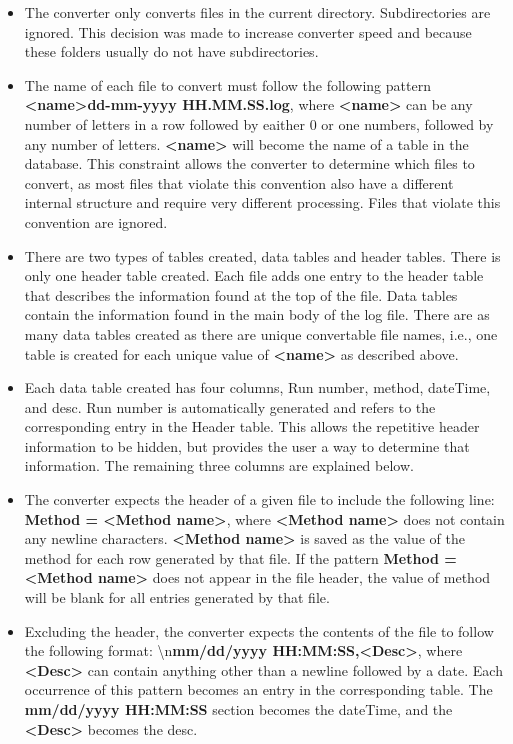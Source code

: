\documentclass[letterpaper,11pt,twoside,final]{article}
\begin{document}
\begin{itemize}
  \item The converter only converts files in the current
directory. Subdirectories are ignored. This decision was made to
increase converter speed and because these folders usually
do not have subdirectories. 
  \item The name of each file to convert must follow the following pattern
    \textbf{<name>dd-mm-yyyy HH.MM.SS.log}, where \textbf{<name>} can
    be any number of letters in a row followed by eaither 0 or one numbers, followed by any number of letters.
    \textbf{<name>} will
    become the name of a table in the database.
    This constraint allows the converter to determine which files to
    convert, as most files that violate this convention also have a
    different internal structure and require very different
    processing. Files that violate this convention are ignored.
  \item There are two types of tables created, data tables and header
    tables. There is only one header table created. Each file adds one
    entry to the header table that describes the information found at
    the top of the file. Data tables contain the information
    found in the main body of the log file. There are as many data
    tables created as there are unique convertable file names, i.e., one
    table is created for each unique value of \textbf{<name>} as
    described above.
    \item
    Each data table created has four columns, Run number, method, dateTime, and
    desc. Run number is automatically generated and refers to the
    corresponding entry in the Header table. This allows the
    repetitive header information to be hidden, but provides the user
    a way to determine that information. The remaining three columns
    are explained below.
  \item The converter expects the header of a given file to include
    the following line: \textbf{Method = <Method name>}, where
    \textbf{<Method name>} does not contain any newline characters. \textbf{<Method name>} is
    saved as the value of the method for each row generated by that
    file. If the pattern \textbf{Method = <Method name>} does not
    appear in the file header, the value of method will be blank for
    all entries generated by that file.
  \item Excluding the header, the converter expects the contents of
    the file to follow the following format: \textbackslash n\textbf{mm/dd/yyyy HH:MM:SS,<Desc>}, where \textbf{<Desc>} can
    contain anything other than a newline followed by a date. Each
    occurrence of this pattern becomes an entry in the corresponding
    table. The \textbf{mm/dd/yyyy HH:MM:SS} section becomes the dateTime, and
    the \textbf{<Desc>} becomes the desc.
\end{itemize}
\end{document}
